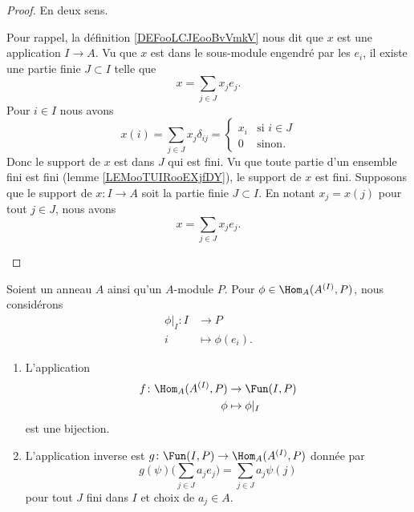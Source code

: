 \begin{proof}
	En deux sens.
	\begin{subproof}
		\spitem[Si \( x\in A^{(I)}\)]
		Pour rappel, la définition \ref{DEFooLCJEooBvVmkV} nous dit que \( x\) est une application \( I\to A\). Vu que \( x\) est dans le sous-module engendré par les \( e_i\), il existe une partie finie \( J\subset I\) telle que
		\begin{equation}
			x=\sum_{j\in J}x_je_j.
		\end{equation}
		Pour \( i\in I\) nous avons
		\begin{equation}
			x(i)=\sum_{j\in J}x_j\delta_{ij}=\begin{cases}
				x_i & \text{si } i\in J \\
				0   & \text{sinon. }
			\end{cases}
		\end{equation}
		Donc le support de \( x\) est dans \( J\) qui est fini. Vu que toute partie d'un ensemble fini est fini (lemme \ref{LEMooTUIRooEXjfDY}), le support de \( x\) est fini.
		Supposons que le support de \( x\colon I\to A\) soit la partie finie \( J\subset I\). En notant \( x_j=x(j)\) pour tout \( j\in J\), nous avons
		\begin{equation}
			x=\sum_{j\in J}x_je_j.
		\end{equation}
	\end{subproof}
\end{proof}

\begin{theorem}      \label{THOooPDZCooJnHbOd}
	Soient un anneau \( A\) ainsi qu'un \( A\)-module \( P\). Pour \( \phi\in\Hom_A(A^{(I)}, P)\), nous considérons
	\begin{equation}
		\begin{aligned}
			\phi|_I\colon I & \to P              \\
			i               & \mapsto \phi(e_i).
		\end{aligned}
	\end{equation}
	\begin{enumerate}
		\item

		      L'application
		      \begin{equation}
			      \begin{aligned}
				      f\colon \Hom_A(A^{(I)},P) & \to \Fun(I,P)   \\
				      \phi                      & \mapsto \phi|_I
			      \end{aligned}
		      \end{equation}
		      est une bijection.
		\item
		      L'application inverse est \( g\colon \Fun(I,P)\to \Hom_A(A^{(I)},P) \) donnée par
		      \begin{equation}
			      g(\psi)\big( \sum_{j\in J}a_je_j \big)=\sum_{j\in J}a_j\psi(j)
		      \end{equation}
		      pour tout \( J\) fini dans \( I\) et choix de \( a_j\in A\).
	\end{enumerate}
\end{theorem}

